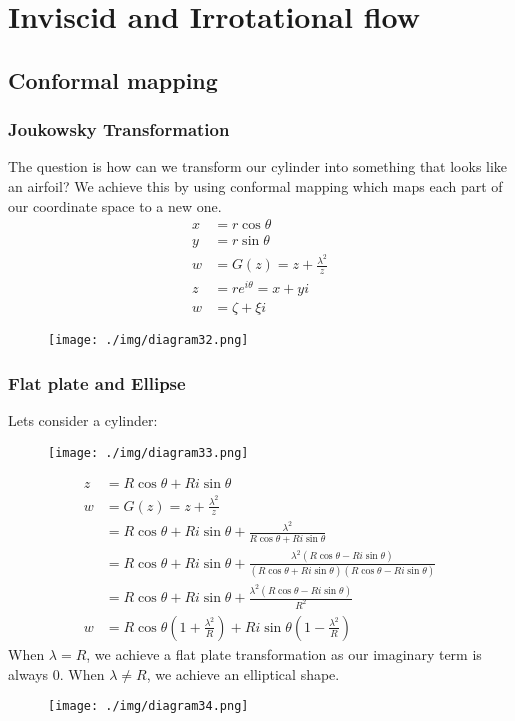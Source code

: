 \chapter{Inviscid and Irrotational flow}
\section{Conformal mapping}
\subsection{Joukowsky Transformation}
The question is how can we transform our cylinder into something that looks like an airfoil? We achieve this by using conformal mapping which maps each part of our coordinate space to a new one.
\begin{align}
  x & = r\cos{\theta}                  \\
  y & = r\sin{\theta}                  \\
  w & = G(z) = z + \frac{\lambda^2}{z} \\
  z & = re^{i\theta} = x + yi          \\
  w & = \zeta + \xi i
\end{align}
\begin{figure}[H]
  \centering
  \texttt{[image: ./img/diagram32.png]}
\end{figure}
\subsection{Flat plate and Ellipse}
Lets consider a cylinder:
\begin{figure}[H]
  \centering
  \texttt{[image: ./img/diagram33.png]}
\end{figure}
\begin{align}
  z & = R\cos{\theta} + Ri\sin{\theta}                                                                                                                       \\
  w & = G(z) = z + \frac{\lambda^2}{z}                                                                                                                       \\
    & =  R\cos{\theta} + Ri\sin{\theta} + \frac{\lambda^2}{R\cos{\theta} + Ri\sin{\theta}}                                                                   \\
    & = R\cos{\theta} + Ri\sin{\theta} + \frac{\lambda^2 (R\cos{\theta} - Ri\sin{\theta})}{(R\cos{\theta} + Ri\sin{\theta})(R\cos{\theta} - Ri\sin{\theta})} \\
    & = R\cos{\theta} + Ri\sin{\theta} + \frac{\lambda^2 (R\cos{\theta} - Ri\sin{\theta})}{R^2}                                                              \\
  w & = R\cos{\theta} \left(1 + \frac{\lambda^2}{R}\right) + Ri\sin{\theta} \left(1 - \frac{\lambda^2}{R}\right)
\end{align}
When $\lambda = R$, we achieve a flat plate transformation as our imaginary term is always 0. When $\lambda \neq R$, we achieve an elliptical shape.
\begin{figure}[H]
  \centering
  \texttt{[image: ./img/diagram34.png]}
\end{figure}
